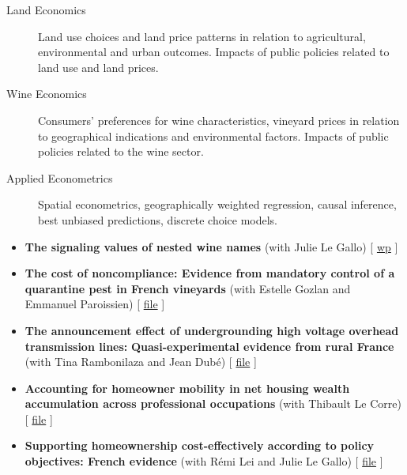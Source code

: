 \documentclass[11pt, a4paper]{./style}
\begin{document}
\label{sec:org02df8a7}

\begin{description}
\item[{Land Economics}] Land use choices and land price patterns in
relation to agricultural, environmental and urban
outcomes. Impacts of public policies related to land use and land
prices.
\item[{Wine Economics}] Consumers' preferences for wine characteristics,
vineyard prices in relation to geographical indications and
environmental factors. Impacts of public policies related to the
wine sector.
\item[{Applied Econometrics}] Spatial econometrics, geographically
weighted regression, causal inference, best unbiased predictions,
discrete choice models.
\end{description}

\label{sec:orgccbc8d1}

\begin{itemize}
\item \textbf{The signaling values of nested wine names} (with Julie Le
Gallo) [ \href{https://wine-economics.org/wp-content/uploads/2021/05/AAWE\_WP265.pdf}{wp} ]
\item \textbf{The cost of noncompliance: Evidence from mandatory control of a
quarantine pest in French vineyards} (with Estelle Gozlan and
Emmanuel Paroissien) [ \href{doc/RISCA-FILE.pdf}{file} ]
\item \textbf{The announcement effect of undergrounding high voltage overhead
transmission lines:} \textbf{Quasi-experimental evidence from rural
France} (with Tina Rambonilaza and Jean Dubé) [ \href{doc/HVTOL-FILE.pdf}{file} ]
\item \textbf{Accounting for homeowner mobility in net housing wealth
accumulation across professional occupations} (with Thibault Le
Corre) [ \href{doc/PPL-FILE.pdf}{file} ]
\item \textbf{Supporting homeownership cost-effectively according to policy
objectives: French evidence} (with Rémi Lei and Julie Le Gallo) [
\href{doc/CEREM-FILE.pdf}{file} ]
\end{itemize}

\label{sec:org242699f}
\label{sec:orgb45fcb5}
\end{document}
